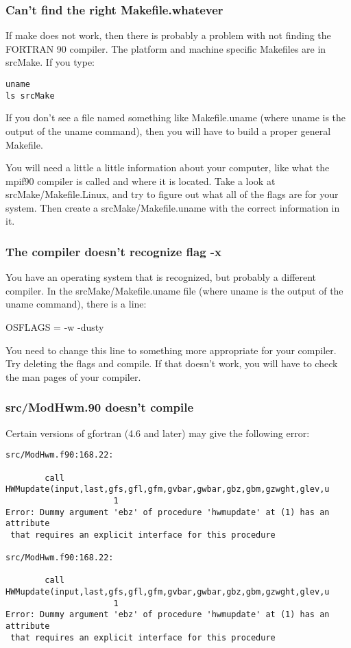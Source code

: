 \subsubsection{Can't find the right Makefile.whatever}

If make does not work, then there is probably a problem with not
finding the FORTRAN 90 compiler. The platform and machine specific
Makefiles are in srcMake. If you type:
\begin{verbatim}
uname 
ls srcMake
\end{verbatim}

If you don't see a file named something like Makefile.uname (where
uname is the output of the uname command), then you will have to build
a proper general Makefile.

You will need a little a little information about your computer, like
what the mpif90 compiler is called and where it is located. Take a
look at srcMake/Makefile.Linux, and try to figure out what all of the
flags are for your system. Then create a srcMake/Makefile.uname with
the correct information in it.

\subsubsection{The compiler doesn't recognize flag -x}

You have an operating system that is recognized, but probably a
different compiler. In the srcMake/Makefile.uname file (where uname is
the output of the uname command), there is a line:

OSFLAGS	= -w -dusty

You need to change this line to something more appropriate for your
compiler. Try deleting the flags and compile. If that doesn't work,
you will have to check the man pages of your compiler.

\subsubsection{src/ModHwm.90 doesn't compile}

Certain versions of gfortran (4.6 and later) may give the following error:

\begin{verbatim}
src/ModHwm.f90:168.22:

        call HWMupdate(input,last,gfs,gfl,gfm,gvbar,gwbar,gbz,gbm,gzwght,glev,u
                      1
Error: Dummy argument 'ebz' of procedure 'hwmupdate' at (1) has an attribute
 that requires an explicit interface for this procedure

src/ModHwm.f90:168.22:

        call HWMupdate(input,last,gfs,gfl,gfm,gvbar,gwbar,gbz,gbm,gzwght,glev,u
                      1
Error: Dummy argument 'ebz' of procedure 'hwmupdate' at (1) has an attribute
 that requires an explicit interface for this procedure
\end{verbatim}

